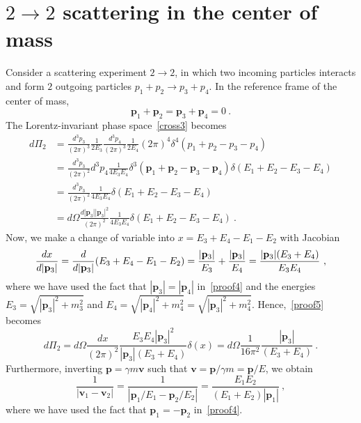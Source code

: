 \section{$2 \rightarrow 2$ scattering in the center of mass}

    Consider a scattering experiment $2 \rightarrow 2$, in which two incoming particles interacts and form $2$ outgoing particles $p_1 + p_2 \rightarrow p_3 + p_4$. In the reference frame of the center of mass, 
    \begin{equation}\label{proof4}
        \mathbf p_1 + \mathbf p_2 = \mathbf p_3 + \mathbf p_4 = 0 ~.
    \end{equation}
    The Lorentz-invariant phase space~\eqref{cross3} becomes 
    \begin{align}\label{proof5}
        d \Pi_2 & = \frac{d^3 p_3}{(2\pi)^3} \frac{1}{2 E_3} \frac{d^3 p_4}{(2\pi)^3} \frac{1}{2 E_4} (2\pi)^4 \delta^4 (p_1 + p_2 - p_3 - p_4) \\ & = \frac{d^3 p_3}{(2\pi)^2} d^3 p_4 \frac{1}{4 E_3 E_4} \delta^3 (\mathbf p_1 + \mathbf p_2 - \mathbf p_3 - \mathbf p_4) \delta (E_1 + E_2 - E_3 - E_4) \\ & = \frac{d^3 p_3}{(2\pi)^2} \frac{1}{4 E_3 E_4} \delta (E_1 + E_2 - E_3 - E_4) \\ &  = d\Omega \frac{d |\mathbf p_3| |\mathbf p_3|^2}{(2\pi)^2} \frac{1}{4 E_3 E_4} \delta (E_1 + E_2 - E_3 - E_4) ~.
    \end{align}
    Now, we make a change of variable into $x = E_3 + E_4 - E_1 - E_2$ with Jacobian
    \begin{equation*}
        \frac{dx}{d|\mathbf p_3|} = \frac{d}{d|\mathbf p_3|} (E_3 + E_4 - E_1 - E_2) = \frac{|\mathbf p_3|}{E_3} + \frac{|\mathbf p_3|}{E_4} = \frac{|\mathbf p_3| (E_3 + E_4)}{E_3 E_4}  ~,
    \end{equation*}
    where we have used the fact that $|\mathbf p_3| = |\mathbf p_4|$ in~\eqref{proof4} and the energies $E_3 = \sqrt{|\mathbf p_3|^2 + m_3^2}$ and $E_4 = \sqrt{|\mathbf p_4|^2 + m_4^2} = \sqrt{|\mathbf p_3|^2 + m_4^2}$. Hence,~\eqref{proof5} becomes 
    \begin{equation}\label{proof6}
        d \Pi_2 = d\Omega \frac{d x}{(2\pi)^2} \frac{E_3 E_4 |\mathbf p_3|^2}{|\mathbf p_3| (E_3 + E_4)} \delta (x) = d\Omega \frac{1}{16 \pi^2} \frac{|\mathbf p_3|}{(E_3 + E_4)} ~.
    \end{equation}
    Furthermore, inverting $\mathbf p = \gamma m \mathbf v$ such that $\mathbf v = \mathbf p/\gamma m = \mathbf p / E$, 
    we obtain
    \begin{equation}\label{proof7}
        \frac{1}{|\mathbf v_1 - \mathbf v_2|} = \frac{1}{| \mathbf p_1 / E_1 - \mathbf p_2 / E_2|} = \frac{E_1 E_2}{(E_1 + E_2) |\mathbf p_1|} ~, 
    \end{equation}
    where we have used the fact that $\mathbf p_1 = - \mathbf p_2$ in~\eqref{proof4}.

